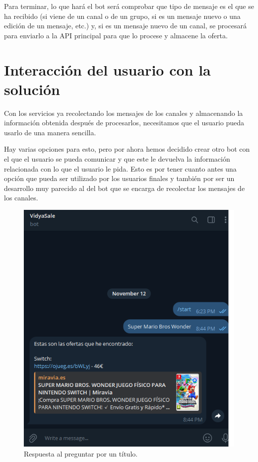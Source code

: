 Para terminar, lo que hará el bot será comprobar que tipo de mensaje es el que se 
ha recibido (si viene de un canal o de un grupo, si es un mensaje nuevo o una 
edición de un mensaje, etc.) y, si es un mensaje nuevo de un canal, se procesará 
para enviarlo a la API principal para que lo procese y almacene la oferta.

\section{Interacción del usuario con la solución}

Con los servicios ya recolectando los mensajes de los canales y almacenando la 
información obtenida después de procesarlos, necesitamos que el usuario pueda 
usarlo de una manera sencilla.

Hay varias opciones para esto, pero por ahora hemos decidido crear otro bot con el 
que el usuario se pueda comunicar y que este le devuelva la información relacionada 
con lo que el usuario le pida. Esto es por tener cuanto antes una opción que pueda 
ser utilizado por los usuarios finales y también por ser un desarrollo muy parecido 
al del bot que se encarga de recolectar los mensajes de los canales.

\begin{figure}[h]
    \centering
    \includegraphics[scale=0.6]{figuras/respuesta-bot.png}
    \caption{Respuesta al preguntar por un título.}
    \label{fig:respuesta_bot}
\end{figure}

